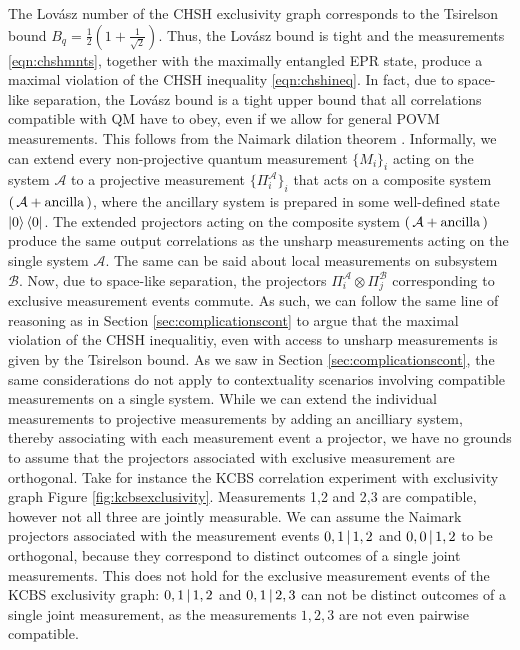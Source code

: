 The Lovász number of the CHSH exclusivity graph corresponds to the Tsirelson bound $B_q = \frac{1}{2}(1+\frac{1}{\sqrt{2}})$. Thus, the Lovász bound is tight and the measurements \ref{eqn:chshmnts}, together with the maximally entangled EPR state, produce a maximal violation of the CHSH inequality \ref{eqn:chshineq}. In fact, due to space-like separation, the Lovász bound is a tight upper bound that all correlations compatible with QM have to obey, even if we allow for general POVM measurements. This follows from the Naimark dilation theorem \cite{Watrous2018}. Informally, we can extend every non-projective quantum measurement $\{M_i\}_i$ acting on the system $\mathcal{A}$ to a projective measurement $\{\Pi_i^{\mathcal{A}}\}_i$ that acts on a composite system $(\thinspace\mathcal{A}+\text{ancilla}\thinspace)$, where the ancillary system is prepared in some well-defined state $\ket{0}\bra{0}$. The extended projectors acting on the composite system $(\thinspace\mathcal{A}+\text{ancilla}\thinspace)$ produce the same output correlations as the unsharp measurements acting on the single system $\mathcal{A}$. The same can be said about local measurements on subsystem $\mathcal{B}$. Now, due to space-like separation, the projectors $\Pi_i^{\mathcal{A}}\otimes \Pi_j^{\mathcal{B}}$ corresponding to exclusive measurement events commute. As such, we can follow the same line of reasoning as in Section \ref{sec:complicationscont} to argue that the maximal violation of the CHSH inequalitiy, even with access to unsharp measurements is given by the Tsirelson bound. As we saw in Section \ref{sec:complicationscont}, the same considerations do not apply to contextuality scenarios involving compatible measurements on a single system. While we can extend the individual measurements to projective measurements by adding an ancilliary system, thereby associating with each measurement event a projector, we have no grounds to assume that the projectors associated with exclusive measurement are orthogonal. Take for instance the KCBS correlation experiment with exclusivity graph Figure \ref{fig:kcbsexclusivity}. Measurements 1,2 and 2,3 are compatible, however not all three are jointly measurable. We can assume the Naimark projectors associated with the measurement events $0,1\thinspace\vert\thinspace 1,2$ and $0,0\thinspace\vert\thinspace 1,2$ to be orthogonal, because they correspond to distinct outcomes of a single joint measurements. This does not hold for the exclusive measurement events of the KCBS exclusivity graph: $0,1\thinspace\vert\thinspace 1,2$ and $0,1\thinspace\vert\thinspace 2,3$ can not be distinct outcomes of a single joint measurement, as the measurements $1,2,3$ are not even pairwise compatible.

